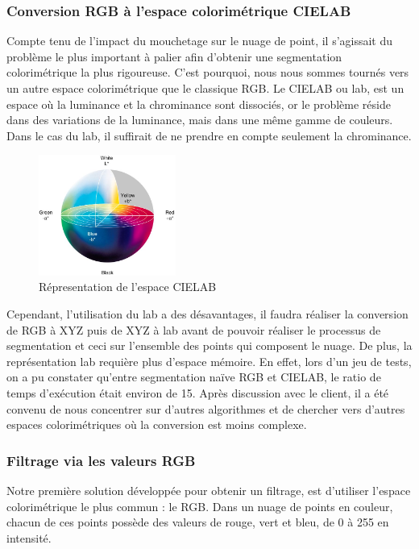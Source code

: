 \documentclass[12pt,titlepage,french]{article}
\begin{document}
\subsubsection{Conversion RGB à l'espace colorimétrique CIELAB}

Compte tenu de l'impact du mouchetage sur le nuage de point, il s'agissait du problème le plus important à palier afin d'obtenir une segmentation colorimétrique la plus rigoureuse.
C'est pourquoi, nous nous sommes tournés vers un autre espace colorimétrique que le classique RGB.
Le CIELAB ou lab, est un espace où la luminance et la chrominance sont dissociés, or le problème réside dans des variations de la luminance, mais dans une même gamme de couleurs.
Dans le cas du lab, il suffirait de ne prendre en compte seulement la chrominance.
\newline

\begin{figure}[H]
\center
\includegraphics[width=0.4\textwidth]{./img/CIELAB.png}
    \caption{\label{} Répresentation de l'espace CIELAB}
\end{figure}

Cependant, l'utilisation du lab a des désavantages, il faudra réaliser la conversion de RGB à XYZ puis de XYZ à lab avant de pouvoir réaliser le processus de segmentation et ceci sur l'ensemble des points qui composent le nuage.
De plus, la représentation lab requière plus d'espace mémoire. En effet, lors d'un jeu de tests, on a pu constater qu'entre segmentation naïve RGB et CIELAB, le ratio de temps d'exécution était environ de 15.
Après discussion avec le client, il a été convenu de nous concentrer sur d'autres algorithmes et de chercher vers d'autres espaces colorimétriques où la conversion est moins complexe.

\subsubsection{Filtrage via les valeurs RGB}

Notre première solution développée pour obtenir un filtrage, est d'utiliser l'espace colorimétrique le plus commun : le RGB. Dans un nuage de points en couleur, chacun de ces points possède des valeurs de rouge, vert et bleu, de 0 à 255 en intensité.
\end{document}
